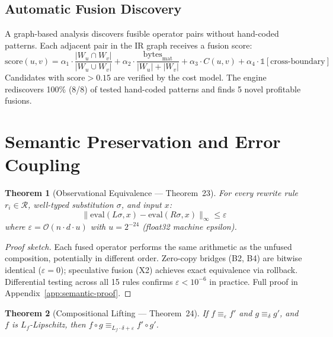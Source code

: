 \documentclass{article}
\newtheorem{theorem}{Theorem}
\theoremstyle{definition}
\theoremstyle{remark}
\newcommand{\BigO}{\mathcal{O}}
\begin{document}
\subsection{Automatic Fusion Discovery}

A graph-based analysis discovers fusible operator pairs without hand-coded patterns. Each adjacent pair in the IR graph receives a fusion score:
\[
  \mathrm{score}(u, v) = \alpha_1 \cdot \frac{|W_u \cap W_v|}{|W_u \cup W_v|} + \alpha_2 \cdot \frac{\text{bytes}_{\mathrm{mat}}}{|W_u| + |W_v|} + \alpha_3 \cdot C(u,v) + \alpha_4 \cdot \mathbb{1}[\text{cross-boundary}]
\]
Candidates with $\mathrm{score} > 0.15$ are verified by the cost model.
The engine rediscovers 100\% (8/8) of tested hand-coded patterns and finds 5 novel profitable fusions.

\section{Semantic Preservation and Error Coupling}\label{sec:semantic}

\begin{theorem}[Observational Equivalence --- Theorem~23]\label{thm:obs-equiv}
For every rewrite rule $r_i \in \mathcal{R}$, well-typed substitution $\sigma$, and input $x$:
\[
  \|\mathrm{eval}(L\sigma, x) - \mathrm{eval}(R\sigma, x)\|_\infty \leq \varepsilon
\]
where $\varepsilon = \BigO(n \cdot d \cdot u)$ with $u = 2^{-24}$ (float32 machine epsilon).
\end{theorem}

\begin{proof}[Proof sketch]
Each fused operator performs the same arithmetic as the unfused composition, potentially in different order.
Zero-copy bridges (B2, B4) are bitwise identical ($\varepsilon = 0$); speculative fusion (X2) achieves exact equivalence via rollback.
Differential testing across all 15 rules confirms $\varepsilon < 10^{-6}$ in practice. Full proof in Appendix~\ref{app:semantic-proof}.
\end{proof}

\begin{theorem}[Compositional Lifting --- Theorem~24]\label{thm:compositional}
If $f \equiv_\varepsilon f'$ and $g \equiv_\delta g'$, and $f$ is $L_f$-Lipschitz, then $f \circ g \equiv_{L_f \cdot \delta + \varepsilon} f' \circ g'$.
\end{theorem}
\end{document}
